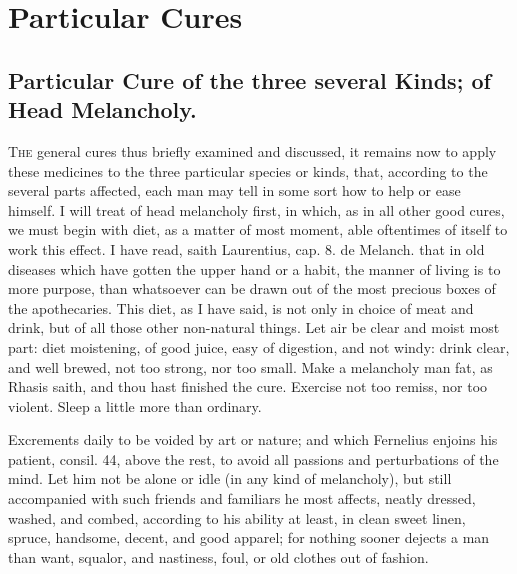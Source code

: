 \chapter{Particular Cures}

\section[Cure of three kinds]{Particular Cure of the three several Kinds; of Head Melancholy.}

\lettrine{T}{he} general cures thus briefly examined and discussed, it remains now
to apply these medicines to the three particular species or kinds,
that, according to the several parts affected, each man may tell in
some sort how to help or ease himself. I will treat of head melancholy
first, in which, as in all other good cures, we must begin with diet,
as a matter of most moment, able oftentimes of itself to work this
effect. I have read, saith Laurentius, cap. 8. de Melanch. that in old
diseases which have gotten the upper hand or a habit, the manner of
living is to more purpose, than whatsoever can be drawn out of the most
precious boxes of the apothecaries. This diet, as I have said, is not
only in choice of meat and drink, but of all those other non-natural
things. Let air be clear and moist most part: diet moistening, of good
juice, easy of digestion, and not windy: drink clear, and well brewed,
not too strong, nor too small. Make a melancholy man fat, as
Rhasis saith, and thou hast finished the cure. Exercise not too
remiss, nor too violent. Sleep a little more than ordinary.

Excrements daily to be voided by art or nature; and which
Fernelius enjoins his patient, consil. 44, above the rest, to avoid all
passions and perturbations of the mind. Let him not be alone or idle
(in any kind of melancholy), but still accompanied with such friends
and familiars he most affects, neatly dressed, washed, and combed,
according to his ability at least, in clean sweet linen, spruce,
handsome, decent, and good apparel; for nothing sooner dejects a man
than want, squalor, and nastiness, foul, or old clothes out of fashion.

